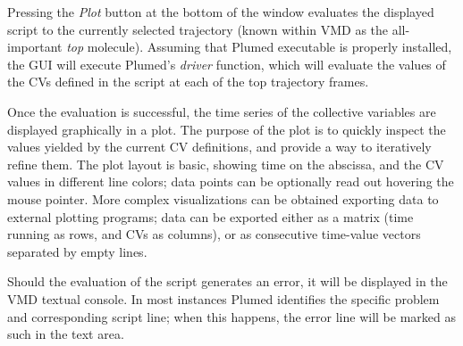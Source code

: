 \documentclass[preprint,review,11pt]{elsarticle}
\begin{document}
Pressing the \emph{Plot} button at the bottom of the window evaluates
the displayed script to the currently selected trajectory (known
within VMD as the all-important \emph{top} molecule). Assuming that
Plumed executable is properly installed, the GUI will execute Plumed's
\emph{driver} function, which will evaluate the values of the CVs
defined in the script at each of the top trajectory frames.

Once the evaluation is successful, the time series of the collective
variables are displayed graphically in a plot.  The purpose of the
plot is to quickly inspect the values yielded by the current CV
definitions, and provide a way to iteratively refine them. The plot
layout is basic, showing time on the abscissa, and the CV values in
different line colors; data points can be optionally read out hovering the
mouse pointer.  More complex visualizations can be obtained exporting
data to external plotting programs; data can be exported 
either as a matrix (time running as rows, and CVs as
columns), or as consecutive time-value vectors separated by empty
lines.

Should the evaluation of the script generates an error, it will be
displayed in the VMD textual console.  In most instances Plumed
identifies the specific problem and corresponding script line; when
this happens, the error line will be marked as such in the text area.
\end{document}

